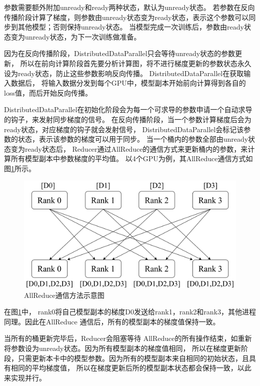 参数需要额外附加unready和ready两种状态，默认为unready状态。
若参数在反向传播阶段计算了梯度，则参数由unready状态变为ready状态，表示这个参数可以同步到其他模型；否则保持unready状态。
当模型完成一次训练后，参数由ready状态变为unready状态，为下一次训练做准备。

因为在反向传播阶段，DistributedDataParallel只会等待unready状态的参数更新，
所以在前向计算阶段首先要分析计算图，将不进行梯度更新的参数状态永久设为ready状态，防止这些参数影响反向传播。
DistributedDataParallel在获取输入数据后，
将输入数据分发到每个GPU中，模型副本开始前向计算得到各自的loss值，而后开始反向传播。

DistributedDataParallel在初始化阶段会为每一个可求导的参数申请一个自动求导的钩子，来发射同步梯度的信号。
在反向传播阶段，当一个参数计算梯度后会为ready状态，对应梯度的钩子就会发射信号，
DistributedDataParallel会标记该参数的状态，表示该参数的梯度可以用于同步。
当一个桶内的参数全部由unready状态变为ready状态后，
Reducer通过AllReduce的通信方式来更新桶内的参数，来计算所有模型副本中参数梯度的平均值。
以4个GPU为例，其AllReduce通信方式如图\ref{fig:allre}所示。

\begin{figure}[h]
    \centering
    \includegraphics[scale=0.1]{figure/all-reduce.png}
    \caption{AllReduce通信方法示意图}
    \label{fig:allre}
\end{figure}

在图\ref{fig:allre}中，
rank0将自己模型副本的梯度D0发送给rank1，rank2和rank3，其他进程同理。因此在AllReduce
通信后，所有的模型副本的梯度值保持一致。

当所有的桶更新完毕后，Reducer会阻塞等待
AllReduce的所有操作结束，如重新将参数设为unready状态。因为所有模型副本的梯度值相同，
所以在梯度更新阶段，只需更新本卡中的模型参数。因为所有的模型副本来自相同的初始状态，且具有相同的平均梯度值，
所以在梯度更新后所的模型副本状态都会保持一致，以此来实现并行。

